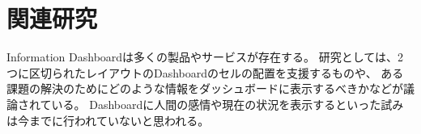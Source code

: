 \section{関連研究}

Information Dashboardは多くの製品やサービスが存在する。
研究としては、2つに区切られたレイアウトのDashboardのセルの配置を支援するものや、
ある課題の解決のためにどのような情報をダッシュボードに表示するべきかなどが議論されている。
Dashboardに人間の感情や現在の状況を表示するといった試みは今までに行われていないと思われる。